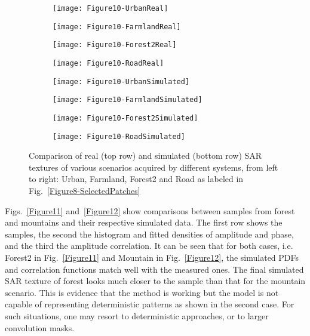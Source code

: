 \documentclass[journal]{IEEEtran}
\begin{document}
\begin{figure*}[hbt]
\centering
\begin{subfigure}[t]{4 cm}
	\centering
	\texttt{[image: Figure10-UrbanReal]}
\end{subfigure}
\quad
\begin{subfigure}[t]{4 cm}
	\centering
	\texttt{[image: Figure10-FarmlandReal]}
\end{subfigure}
\quad
\begin{subfigure}[t]{4 cm}
	\centering
	\texttt{[image: Figure10-Forest2Real]}
\end{subfigure}
\quad
\begin{subfigure}[t]{4 cm}
	\centering
	\texttt{[image: Figure10-RoadReal]}
\end{subfigure}
\quad
\begin{subfigure}[t]{4 cm}
	\centering
	\texttt{[image: Figure10-UrbanSimulated]}
\end{subfigure}
\quad
\begin{subfigure}[t]{4 cm}
	\centering
	\texttt{[image: Figure10-FarmlandSimulated]}
\end{subfigure}
\quad
\begin{subfigure}[t]{4 cm}
	\centering
	\texttt{[image: Figure10-Forest2Simulated]}
\end{subfigure}
\quad
\begin{subfigure}[t]{4 cm}
	\centering
	\texttt{[image: Figure10-RoadSimulated]}
\end{subfigure}
\caption{Comparison of real (top row) and simulated (bottom row) SAR textures of various scenarios acquired by different systems, from left to right: Urban, Farmland, Forest2 and Road as labeled in Fig.~\ref{Figure8-SelectedPatches}}\label{Figure10}
\end{figure*}

Figs.~\ref{Figure11} and~\ref{Figure12} show comparisons between samples from forest and mountains and their respective simulated data.
The first row shows the samples,
the second the histogram and fitted densities of amplitude and phase,
and the third the amplitude correlation.
It can be seen that for both cases, i.e. Forest2 in Fig.~\ref{Figure11} and Mountain in Fig.~\ref{Figure12}, the simulated PDFs and correlation functions match well with the measured ones.
The final simulated SAR texture of forest looks much closer to the sample than that for the mountain scenario.
This is evidence that the method is working but the model is not capable of representing deterministic patterns as shown in the second case.
For such situations, one may resort to deterministic approaches, or to larger convolution masks.
\end{document}
